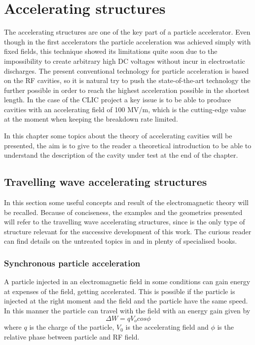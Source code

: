 

\chapter[Accelerating structures]{Accelerating structures}

The accelerating structures are one of the key part of a particle accelerator. Even though in the first accelerators the particle acceleration was achieved simply with fixed fields, this technique showed its limitations quite soon due to the impossibility to create arbitrary high DC voltages without incur in electrostatic discharges. The present conventional technology for particle acceleration is based on the RF cavities, so it is natural try to push the state-of-the-art technology the further possible in order to reach the highest acceleration possible in the shortest length. In the case of the CLIC project a key issue is to be able to produce cavities with an accelerating field of 100 MV/m, which is the cutting-edge value at the moment when keeping the breakdown rate limited.

In this chapter some topics about the theory of accelerating cavities will be presented, the aim is to give to the reader a theoretical introduction to be able to understand the description of the cavity under test at the end of the chapter.

\section[Travelling wave accelerating structures]{Travelling wave accelerating structures}

In this section some useful concepts and result of the electromagnetic theory will be recalled. Because of conciseness, the examples and the geometries presented will refer to the travelling wave accelerating structures, since is the only type of structure relevant for the successive development of this work. The curious reader can find details on the untreated topics in \cite{Weiss:261732,Wangler:RF_LINAC,Humphries:107756} and in plenty of specialised books.

\subsection[Synchronous particle acceleration]{Synchronous particle acceleration}

A particle injected in an electromagnetic field in some conditions can gain energy at expenses of the field, getting accelerated. This is possible if the particle is injected at the right moment and the field and the particle have the same speed. In this manner the particle can travel with the field with an energy gain given by
\begin{equation}
\Delta W = q V_o cos \phi
\end{equation}
where $q$ is the charge of the particle, $V_0$ is the accelerating field and $\phi$ is the relative phase between particle and RF field.

